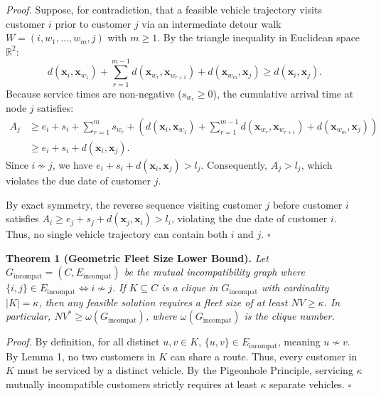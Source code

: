 \vspace{0.15cm}
\noindent\textit{Proof.}
Suppose, for contradiction, that a feasible vehicle trajectory visits customer $i$ prior to customer $j$ via an intermediate detour walk $W = (i, w_1, \dots, w_m, j)$ with $m \ge 1$. By the triangle inequality in Euclidean space $\mathbb{R}^2$:
\begin{equation}
d(\mathbf{x}_i, \mathbf{x}_{w_1}) + \sum_{r=1}^{m-1} d(\mathbf{x}_{w_r}, \mathbf{x}_{w_{r+1}}) + d(\mathbf{x}_{w_m}, \mathbf{x}_j) \ge d(\mathbf{x}_i, \mathbf{x}_j).
\end{equation}
Because service times are non-negative ($s_{w_r} \ge 0$), the cumulative arrival time at node $j$ satisfies:
\begin{align}
A_j &\ge e_i + s_i + \sum_{r=1}^m s_{w_r} + \left( d(\mathbf{x}_i, \mathbf{x}_{w_1}) + \sum_{r=1}^{m-1} d(\mathbf{x}_{w_r}, \mathbf{x}_{w_{r+1}}) + d(\mathbf{x}_{w_m}, \mathbf{x}_j) \right) \nonumber \\
    &\ge e_i + s_i + d(\mathbf{x}_i, \mathbf{x}_j).
\end{align}
Since $i \nsim j$, we have $e_i + s_i + d(\mathbf{x}_i, \mathbf{x}_j) > l_j$. Consequently, $A_j > l_j$, which violates the due date of customer $j$. 

By exact symmetry, the reverse sequence visiting customer $j$ before customer $i$ satisfies $A_i \ge e_j + s_j + d(\mathbf{x}_j, \mathbf{x}_i) > l_i$, violating the due date of customer $i$. Thus, no single vehicle trajectory can contain both $i$ and $j$. \hfill $\square$

\vspace{0.25cm}
\noindent\textbf{Theorem 1 (Geometric Fleet Size Lower Bound).}
\textit{Let $G_{\text{incompat}} = (C, E_{\text{incompat}})$ be the mutual incompatibility graph where $\{i, j\} \in E_{\text{incompat}} \iff i \nsim j$. If $K \subseteq C$ is a clique in $G_{\text{incompat}}$ with cardinality $|K| = \kappa$, then any feasible solution requires a fleet size of at least $NV \ge \kappa$. In particular, $NV^* \ge \omega(G_{\text{incompat}})$, where $\omega(G_{\text{incompat}})$ is the clique number.}

\vspace{0.15cm}
\noindent\textit{Proof.}
By definition, for all distinct $u, v \in K$, $\{u, v\} \in E_{\text{incompat}}$, meaning $u \nsim v$. By Lemma 1, no two customers in $K$ can share a route. Thus, every customer in $K$ must be serviced by a distinct vehicle. By the Pigeonhole Principle, servicing $\kappa$ mutually incompatible customers strictly requires at least $\kappa$ separate vehicles. \hfill $\square$

